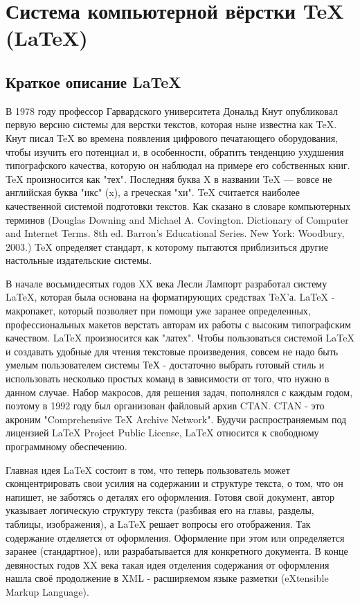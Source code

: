 \documentclass[a4paper,14pt]{report} %
\begin{document}
\tableofcontents %
\chapter{Система компьютерной вёрстки TeX (LaTeX)}
\section{Краткое описание LaTeX}
В 1978 году профессор Гарвардского университета Дональд Кнут опубликовал первую версию системы для верстки текстов, которая ныне известна как TeX.  Кнут писал TeX во времена появления цифрового печатающего оборудования, чтобы изучить его потенциал и, в особенности, обратить тенденцию ухудшения типографского качества, которую он наблюдал на примере его собственных книг. TeX произносится как "тех". Последняя буква X в названии TeX — вовсе не английская буква "икс" (x), а греческая "хи". TeX считается наиболее качественной системой подготовки текстов. Как сказано в словаре компьютерных терминов (Douglas Downing and Michael A. Covington. Dictionary of Computer and Internet Terms. 8th ed. Barron's Educational Series. New York: Woodbury, 2003.) TeX определяет стандарт, к которому пытаются приблизиться другие настольные издательские системы.\par
В начале восьмидесятых годов XX века Лесли Лампорт разработал систему LaTeX, которая была основана на форматирующих средствах TeX'а. LaTeX - макропакет, который позволяет при помощи уже заранее определенных, профессиональных макетов верстать авторам их работы с высоким типографским качеством. LaTeX произносится как "латех". Чтобы пользоваться системой LaTeX и создавать удобные для чтения текстовые произведения, совсем не надо быть умелым пользователем системы ТеХ - достаточно выбрать готовый стиль и использовать несколько простых команд в зависимости от того, что нужно в данном случае. Набор макросов, для решения задач, пополнялся с каждым годом, поэтому в 1992 году был организован файловый архив CTAN. CTAN - это акроним "Comprehensive TeX Archive Network". Будучи распространяемым под лицензией LaTeX Project Public License, LaTeX относится к свободному программному обеспечению.\par
Главная идея LaTeX состоит в том, что теперь пользователь может сконцентрировать свои усилия на содержании и структуре текста, о том, что он напишет, не заботясь о деталях его оформления. Готовя свой документ, автор указывает логическую структуру текста (разбивая его на главы, разделы, таблицы, изображения), а LaTeX решает вопросы его отображения. Так содержание отделяется от оформления. Оформление при этом или определяется заранее (стандартное), или разрабатывается для конкретного документа. В конце девяностых годов XX века такая идея отделения содержания от оформления нашла своё продолжение в XML - расширяемом языке разметки (eXtensible Markup Language).\par
\end{document}
